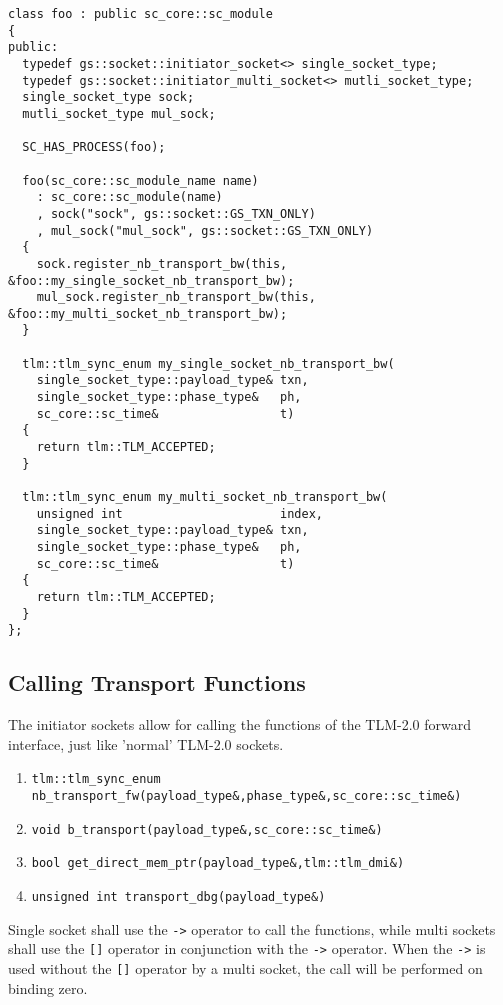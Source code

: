 \documentclass[a4paper,10pt]{article}          %
\begin{document}
\begin{small}
\begin{verbatim}
class foo : public sc_core::sc_module
{
public:
  typedef gs::socket::initiator_socket<> single_socket_type;
  typedef gs::socket::initiator_multi_socket<> mutli_socket_type;
  single_socket_type sock;
  mutli_socket_type mul_sock;
  
  SC_HAS_PROCESS(foo);

  foo(sc_core::sc_module_name name)
    : sc_core::sc_module(name)
    , sock("sock", gs::socket::GS_TXN_ONLY)
    , mul_sock("mul_sock", gs::socket::GS_TXN_ONLY)
  {
    sock.register_nb_transport_bw(this, &foo::my_single_socket_nb_transport_bw);
    mul_sock.register_nb_transport_bw(this, &foo::my_multi_socket_nb_transport_bw);
  }
  
  tlm::tlm_sync_enum my_single_socket_nb_transport_bw(
    single_socket_type::payload_type& txn,
    single_socket_type::phase_type&   ph,
    sc_core::sc_time&                 t)
  {
    return tlm::TLM_ACCEPTED;
  }

  tlm::tlm_sync_enum my_multi_socket_nb_transport_bw(
    unsigned int                      index,
    single_socket_type::payload_type& txn,
    single_socket_type::phase_type&   ph,
    sc_core::sc_time&                 t)
  {
    return tlm::TLM_ACCEPTED;
  }
};
\end{verbatim}
\end{small}


\subsection{Calling Transport Functions}

The initiator sockets allow for calling the functions of the TLM-2.0 forward interface, just like 'normal' TLM-2.0 sockets.

\begin{enumerate}
\item 
\verb|tlm::tlm_sync_enum nb_transport_fw(payload_type&,phase_type&,sc_core::sc_time&)|
\item 
\verb|void b_transport(payload_type&,sc_core::sc_time&)|
\item 
\verb|bool get_direct_mem_ptr(payload_type&,tlm::tlm_dmi&)|
\item 
\verb|unsigned int transport_dbg(payload_type&)|
\end{enumerate}


Single socket shall use the \verb|->| operator to call the functions, while multi sockets shall use the \verb|[]| operator in conjunction with the \verb|->| operator.
When the \verb|->| is used without the \verb|[]| operator by a multi socket, the call will be performed on binding zero.
\end{document}
